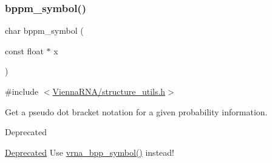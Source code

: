\subsubsection{\texorpdfstring{bppm\+\_\+symbol()}{bppm\_symbol()}}
{\footnotesize\ttfamily char bppm\+\_\+symbol (\begin{DoxyParamCaption}\item[{const float $\ast$}]{x }\end{DoxyParamCaption})}



{\ttfamily \#include $<$\hyperlink{structure__utils_8h}{Vienna\+R\+N\+A/structure\+\_\+utils.\+h}$>$}



Get a pseudo dot bracket notation for a given probability information. 

\begin{DoxyRefDesc}{Deprecated}
\item[\hyperlink{deprecated__deprecated000151}{Deprecated}]Use \hyperlink{group__struct__utils_ga025bff1b27fa46534c8fae6980f64bb5}{vrna\+\_\+bpp\+\_\+symbol()} instead! \end{DoxyRefDesc}
